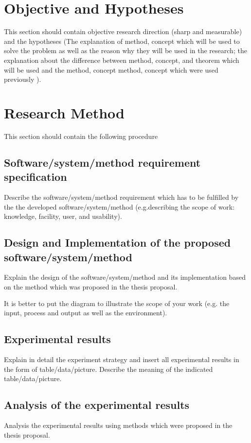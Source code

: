 \documentclass{ittelkom}
\begin{document}
\section{Objective and Hypotheses}

This section should contain objective research direction (sharp and measurable) and the hypotheses (The explanation of method, concept which will be used to solve the problem as well as the reason why they will be used in the research; the explanation about the difference between method, concept, and theorem which will be used and the method, concept method, concept which were used previously ).

\section{Research Method}

This section should contain the following procedure

\subsection{Software/system/method requirement specification }
Describe the software/system/method requirement which has to be fulfilled by the the developed software/system/method (e.g.describing the scope of work: knowledge, facility, user, and usability).

\subsection{Design and Implementation of the proposed software/system/method }
Explain the design of the software/system/method and its implementation based on the method which was proposed in the thesis proposal. 

It is better to put the diagram to illustrate the scope of your work (e.g. the input, process and output as well as the environment).

\subsection{Experimental results }
Explain in detail the experiment strategy and insert all experimental results in the form of table/data/picture. Describe the meaning of the indicated table/data/picture.  

\subsection{Analysis of the experimental results}
Analysis the experimental results using methods which were proposed in the thesis proposal.
\end{document}
